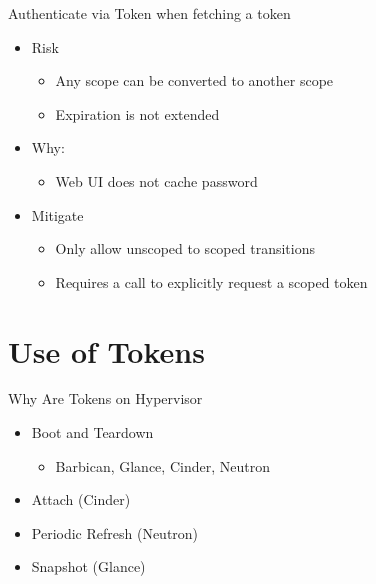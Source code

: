 \documentclass{beamer}
\begin{document}
\begin{frame}{Authenticate via Token when fetching a token}
  \begin{itemize}
  \item Risk
      \begin{itemize}
        \item Any scope can be converted to another scope
        \item Expiration is not extended
      \end{itemize}
    \item Why:
      \begin{itemize}
      \item Web UI does not cache password
      \end{itemize}
    \item Mitigate
      \begin{itemize}
      \item Only allow unscoped to scoped transitions
      \item Requires a call to explicitly request a scoped token
      \end{itemize}
  \end{itemize}
\end{frame}

\section {Use of Tokens }

\begin{frame}{Why Are Tokens on Hypervisor}
  \begin{itemize}
  \item Boot and Teardown
    \begin{itemize}
    \item Barbican, Glance, Cinder, Neutron
    \end {itemize}
  \item Attach (Cinder)
  \item Periodic Refresh (Neutron)
  \item Snapshot (Glance)
  \end {itemize}
\end {frame}
\end{document}
